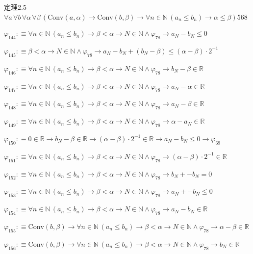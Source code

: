 \begin{fullproof}{定理2.5}{$\forall a\,\forall b\,\forall \alpha\,\forall \beta\,(\mathrm{Conv}(a,\alpha) \to \mathrm{Conv}(b,\beta) \to \forall n \in \mathbb{N}\,(a_{n} \leq b_{n}) \to \alpha \leq \beta)$}{568}
\begin{abbrevlist}
\item $\varphi_{144} :\equiv \forall n \in \mathbb{N}\,(a_{n} \leq b_{n}) \to \beta < \alpha \to N \in \mathbb{N} \land \varphi_{78} \to a_{N} - b_{N} \leq 0$
\item $\varphi_{145} :\equiv \beta < \alpha \to N \in \mathbb{N} \land \varphi_{78} \to a_{N} - b_{N} + (b_{N} - \beta) \leq (\alpha - \beta) \cdot 2^{-1}$
\item $\varphi_{146} :\equiv \forall n \in \mathbb{N}\,(a_{n} \leq b_{n}) \to \beta < \alpha \to N \in \mathbb{N} \land \varphi_{78} \to b_{N} - \beta \in \mathbb{R}$
\item $\varphi_{147} :\equiv \forall n \in \mathbb{N}\,(a_{n} \leq b_{n}) \to \beta < \alpha \to N \in \mathbb{N} \land \varphi_{78} \to a_{N} - \alpha \in \mathbb{R}$
\item $\varphi_{148} :\equiv \forall n \in \mathbb{N}\,(a_{n} \leq b_{n}) \to \beta < \alpha \to N \in \mathbb{N} \land \varphi_{78} \to a_{N} - \beta \in \mathbb{R}$
\item $\varphi_{149} :\equiv \forall n \in \mathbb{N}\,(a_{n} \leq b_{n}) \to \beta < \alpha \to N \in \mathbb{N} \land \varphi_{78} \to \alpha - a_{N} \in \mathbb{R}$
\item $\varphi_{150} :\equiv 0 \in \mathbb{R} \to b_{N} - \beta \in \mathbb{R} \to (\alpha - \beta) \cdot 2^{-1} \in \mathbb{R} \to a_{N} - b_{N} \leq 0 \to \varphi_{69}$
\item $\varphi_{151} :\equiv \forall n \in \mathbb{N}\,(a_{n} \leq b_{n}) \to \beta < \alpha \to N \in \mathbb{N} \land \varphi_{78} \to (\alpha - \beta) \cdot 2^{-1} \in \mathbb{R}$
\item $\varphi_{152} :\equiv \forall n \in \mathbb{N}\,(a_{n} \leq b_{n}) \to \beta < \alpha \to N \in \mathbb{N} \land \varphi_{78} \to b_{N} + -b_{N} = 0$
\item $\varphi_{153} :\equiv \forall n \in \mathbb{N}\,(a_{n} \leq b_{n}) \to \beta < \alpha \to N \in \mathbb{N} \land \varphi_{78} \to a_{N} + -b_{N} \leq 0$
\item $\varphi_{154} :\equiv \forall n \in \mathbb{N}\,(a_{n} \leq b_{n}) \to \beta < \alpha \to N \in \mathbb{N} \land \varphi_{78} \to a_{N} - b_{N} \in \mathbb{R}$
\item $\varphi_{155} :\equiv \mathrm{Conv}(b,\beta) \to \forall n \in \mathbb{N}\,(a_{n} \leq b_{n}) \to \beta < \alpha \to N \in \mathbb{N} \land \varphi_{78} \to \alpha - \beta \in \mathbb{R}$
\item $\varphi_{156} :\equiv \mathrm{Conv}(b,\beta) \to \forall n \in \mathbb{N}\,(a_{n} \leq b_{n}) \to \beta < \alpha \to N \in \mathbb{N} \land \varphi_{78} \to b_{N} \in \mathbb{R}$

\end{abbrevlist}
\end{fullproof}
